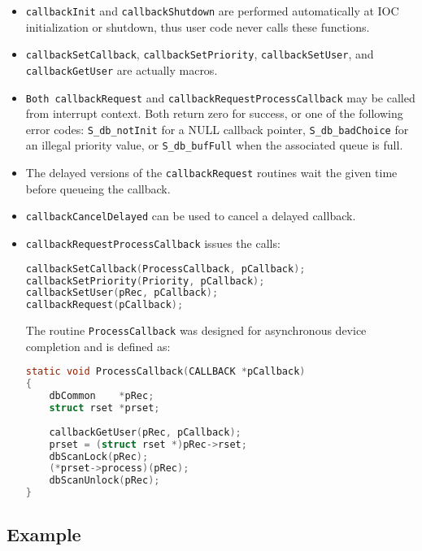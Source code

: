 \begin{itemize}
\item \verb|callbackInit| and \verb|callbackShutdown| are performed automatically at IOC initialization or shutdown,
thus user code never calls these functions.

\item \verb|callbackSetCallback|, \verb|callbackSetPriority|, \verb|callbackSetUser|, and \verb|callbackGetUser| are 
actually macros.

\item \verb|Both callbackRequest| and \verb|callbackRequestProcessCallback| may be called from interrupt context. Both return zero for success, or one of the following error codes: \verb|S_db_notInit| for a NULL callback pointer, \verb|S_db_badChoice| for an illegal priority value, or \verb|S_db_bufFull| when the associated queue is full.

\item The delayed versions of the \verb|callbackRequest| routines wait the given time before queueing the callback.

\item \verb|callbackCancelDelayed| can be used to cancel a delayed callback.

\item \verb|callbackRequestProcessCallback| issues the calls:

\begin{lstlisting}[language=C]
callbackSetCallback(ProcessCallback, pCallback);
callbackSetPriority(Priority, pCallback);
callbackSetUser(pRec, pCallback);
callbackRequest(pCallback);
\end{lstlisting}

The routine \verb|ProcessCallback| was designed for asynchronous device completion and is defined as:

\begin{lstlisting}[language=C]
static void ProcessCallback(CALLBACK *pCallback)
{
    dbCommon    *pRec;
    struct rset *prset;
 
    callbackGetUser(pRec, pCallback);
    prset = (struct rset *)pRec->rset;
    dbScanLock(pRec);
    (*prset->process)(pRec);
    dbScanUnlock(pRec);
}
\end{lstlisting}

\end{itemize}

\subsection{Example}

